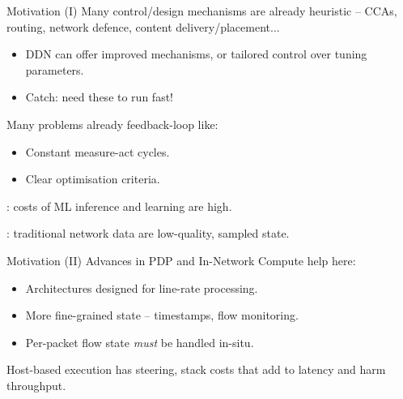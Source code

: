 \documentclass[aspectratio=169,xcolor={dvipsnames}]{beamer}
\begin{document}
	\begin{frame}{Motivation (I)}
		Many control/design mechanisms are already heuristic -- CCAs, routing, network defence, content delivery/placement...
		\begin{itemize}
			\item DDN can offer improved mechanisms, or tailored control over tuning parameters.
			\item Catch: need these to run \alert{fast}!
		\end{itemize}
		
		Many problems already feedback-loop like:
		\begin{itemize}
			\item Constant measure-act cycles.
			\item Clear optimisation criteria. %
		\end{itemize}
	
		: costs of ML inference and learning are high.
		
		: traditional network data are low-quality, sampled state.

	\end{frame}

	\begin{frame}{Motivation (II)}
		Advances in PDP and In-Network Compute help here:
		\begin{itemize}
			\item Architectures designed for line-rate processing.
			\item More fine-grained state -- timestamps, flow monitoring.
			\item Per-packet flow state \emph{must} be handled in-situ.
		\end{itemize}
	
		Host-based execution has steering, stack costs that add to latency and harm throughput.
		
%	
%		
%		
%		
%		
	\end{frame}
\end{document}
